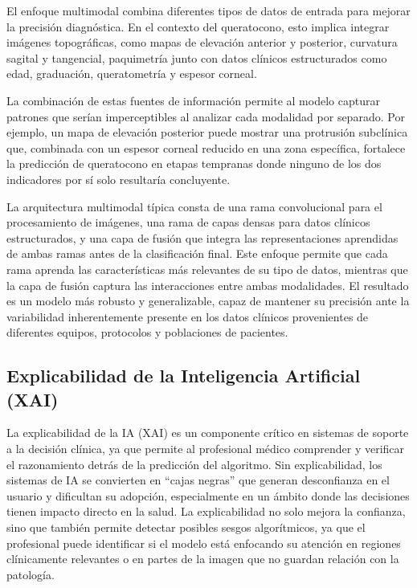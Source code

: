         El enfoque multimodal combina diferentes tipos de datos de entrada para mejorar la precisión diagnóstica. En el contexto del queratocono, esto implica integrar imágenes topográficas, como mapas de elevación anterior y posterior, curvatura sagital y tangencial, paquimetría junto con datos clínicos estructurados como edad, graduación, queratometría y espesor corneal. 
        
        La combinación de estas fuentes de información permite al modelo capturar patrones que serían imperceptibles al analizar cada modalidad por separado. Por ejemplo, un mapa de elevación posterior puede mostrar una protrusión subclínica que, combinada con un espesor corneal reducido en una zona específica, fortalece la predicción de queratocono en etapas tempranas donde ninguno de los dos indicadores por sí solo resultaría concluyente.

        La arquitectura multimodal típica consta de una rama convolucional para el procesamiento de imágenes, una rama de capas densas para datos clínicos estructurados, y una capa de fusión que integra las representaciones aprendidas de ambas ramas antes de la clasificación final. Este enfoque permite que cada rama aprenda las características más relevantes de su tipo de datos, mientras que la capa de fusión captura las interacciones entre ambas modalidades. El resultado es un modelo más robusto y generalizable, capaz de mantener su precisión ante la variabilidad inherentemente presente en los datos clínicos provenientes de diferentes equipos, protocolos y poblaciones de pacientes.

    \subsection{Explicabilidad de la Inteligencia Artificial (XAI)}

        La explicabilidad de la IA (XAI) es un componente crítico en sistemas de soporte a la decisión clínica, ya que permite al profesional médico comprender y verificar el razonamiento detrás de la predicción del algoritmo. Sin explicabilidad, los sistemas de IA se convierten en ``cajas negras'' que generan desconfianza en el usuario y dificultan su adopción, especialmente en un ámbito donde las decisiones tienen impacto directo en la salud. La explicabilidad no solo mejora la confianza, sino que también permite detectar posibles sesgos algorítmicos, ya que el profesional puede identificar si el modelo está enfocando su atención en regiones clínicamente relevantes o en partes de la imagen que no guardan relación con la patología.

